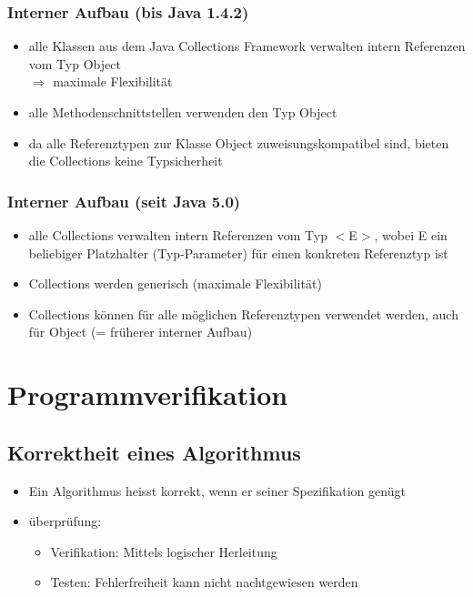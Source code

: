 \documentclass[a4paper,10pt]{article}
\begin{document}
\subsubsection{Interner Aufbau (bis Java 1.4.2)}
\begin{itemize}
	\item alle Klassen aus dem Java Collections Framework verwalten intern Referenzen vom Typ Object \\ $\Rightarrow$ maximale Flexibilit\"at
	\item alle Methodenschnittstellen verwenden den Typ Object
	\item da alle Referenztypen zur Klasse Object zuweisungskompatibel sind, bieten die Collections keine Typsicherheit
\end{itemize}

\subsubsection{Interner Aufbau (seit Java 5.0)}
\begin{itemize}
	\item alle Collections verwalten intern Referenzen vom Typ $<$E$>$, wobei E ein beliebiger Platzhalter (Typ-Parameter) f\"ur einen konkreten Referenztyp ist
	\item Collections werden generisch (maximale Flexibilit\"at)
	\item Collections k\"onnen f\"ur alle m\"oglichen Referenztypen verwendet werden, auch
f\"ur Object (= fr\"uherer interner Aufbau)
\end{itemize}

\pagebreak
\section{Programmverifikation}
\subsection{Korrektheit eines Algorithmus}
\begin{itemize}
\item Ein Algorithmus heisst korrekt, wenn er seiner Spezifikation gen\"ugt
\item \"uberpr\"ufung:
	\begin{itemize}
	\item Verifikation: Mittels logischer Herleitung
	\item Testen: Fehlerfreiheit kann nicht nachtgewiesen werden
	\end{itemize}
\end{itemize}
\end{document}
